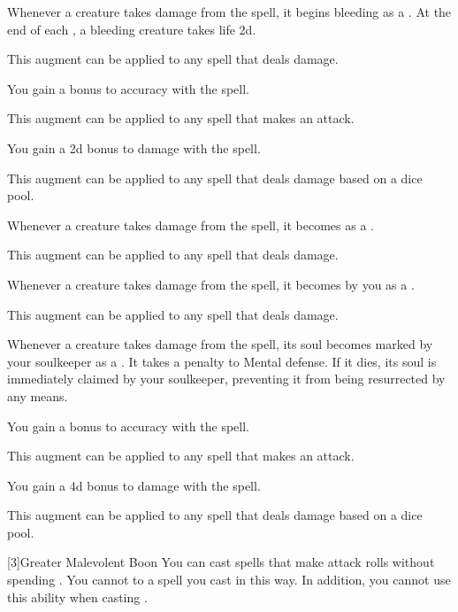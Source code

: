 {             Whenever a creature takes damage from the spell, it begins bleeding as a .
            At the end of each , a bleeding creature takes life  \minus2d.
            \par This augment can be applied to any spell that deals damage.

             You gain a  bonus to accuracy with the spell.
            \par This augment can be applied to any spell that makes an attack.

             You gain a \plus2d bonus to damage with the spell.
            \par This augment can be applied to any spell that deals damage based on a dice pool.

             Whenever a creature takes damage from the spell, it becomes  as a .
            \par This augment can be applied to any spell that deals damage.

             Whenever a creature takes damage from the spell, it becomes  by you as a .
            \par This augment can be applied to any spell that deals damage.

             Whenever a creature takes damage from the spell, its soul becomes marked by your soulkeeper as a .
            It takes a  penalty to Mental defense.
            If it dies, its soul is immediately claimed by your soulkeeper, preventing it from being resurrected by any means.

             You gain a  bonus to accuracy with the spell.
            \par This augment can be applied to any spell that makes an attack.

             You gain a \plus4d bonus to damage with the spell.
            \par This augment can be applied to any spell that deals damage based on a dice pool.
        }

        [3]{Greater Malevolent Boon} You can cast spells that make attack rolls without spending .
        You cannot  to a spell you cast in this way.
        In addition, you cannot use this ability when casting .

